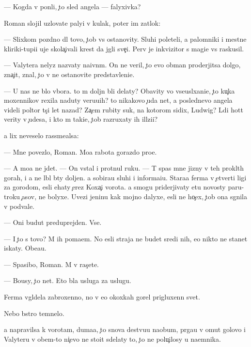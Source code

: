 \documentclass[10pt]{book}
\begin{document}
— Kogda v{\yi} pon{\ia}li, {\c}to sled angela — falyxivka?

Roman slojil uzlovat{\yi}{\y}e paly{\q}i v kulak, poter im zat{\yi}lok:

— Slixkom pozdno dl{\ia} tovo, {\c}tob{\yi} vs{\e} ostanovity. Sluhi poleteli, a palomniki i mestn{\yi}{\y}e kliriki-tupi{\q}i uje skola{\c}ivali krest da jgli sve{\c}i. Perv{\yi}{\y} je inkvizitor s magi{\y}e{\y} vs{\e} raskusil.

— Valytera nelyz{\ia} nazvaty na{\y}ivn{\yi}m. On ne veril, {\c}to {\y}evo obman proderjitsa dolgo, zna{\c}it, znal, {\c}to v{\yi} ne ostanovite predstavleni{\y}e.

— U nas ne b{\yi}lo v{\yi}bora. {\C}to m{\yi} doljn{\yi} b{\yi}li delaty? Ob{\y}avity vo vseusl{\yi}xani{\y}e, {\c}to ku{\c}ka moxennikov rexila naduty veru{\y}u{\x}ih? {\C}to nikakovo {\c}uda net, a poslednevo angela videli poltor{\yi} t{\yi}s{\ia}{\c}i let nazad? Za{\c}em rubity suk, na kotorom sidix, Ludwig? L{\iu}di hot{\ia}t verity v {\c}udesa, i kto m{\yi} taki{\y}e, {\c}tob{\yi} razruxaty ih ill{\iu}zi{\y}i?

{\Y}a lix neveselo rassme{\y}alsa:

— Mne povezlo, Roman. Mo{\y}a rabota gorazdo pro{\x}e.

— A mo{\y}a ne jdet. — On vstal i prot{\ia}nul ruku. — T{\yi} spas mne jizny v teh prokl{\ia}t{\yi}h gorah, i {\y}a ne l{\iu}bl{\iu} b{\yi}ty doljen. {\Y}a sobira{\y}u sluhi i informa{\q}i{\y}u. Stara{\y}a ferma v {\c}etverti ligi za gorodom, {\y}esli {\y}ehaty {\c}erez Koxa{\c}{\yf}i vorota. {\Y}a smogu priderjivaty etu novosty paru-tro{\y}ku {\c}asov, ne bolyxe. Uvezi jen{\x}inu kak mojno dalyxe, {\y}esli ne ho{\c}ex, {\c}tob{\yi} ona sgnila v podvale.

— Oni budut preduprejden{\yi}. Vse.

— I {\c}to s tovo? M{\yi} ih po{\y}ma{\y}em. No {\y}esli straja ne budet sredi nih, {\y}e{\y}o nikto ne stanet iskaty. Obe{\x}a{\y}u.

— Spasibo, Roman. M{\yi} v ras{\c}ete.

— Bo{\y}usy, {\c}to net. Eto b{\yi}la usluga za uslugu.



Ferma v{\yi}gl{\ia}dela zabroxenno{\y}, no v {\y}e{\y}o okoxkah gorel prigluxenn{\yi}{\y} svet.

Nebo b{\yi}stro temnelo.

{\Y}a napravilsa k vorotam, duma{\y}a, {\c}to snova de{\y}stvu{\y}u naobum, pr{\yi}ga{\y}u v omut golovo{\y} i Valyteru v ob{\x}em-to ni{\c}evo ne sto{\y}it sdelaty to, {\c}to ne polu{\c}ilosy u na{\y}emnika.
\end{document}
